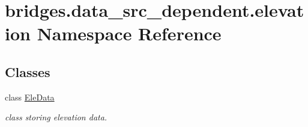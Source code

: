 \hypertarget{namespacebridges_1_1data__src__dependent_1_1elevation}{}\section{bridges.\+data\+\_\+src\+\_\+dependent.\+elevation Namespace Reference}
\label{namespacebridges_1_1data__src__dependent_1_1elevation}
\subsection*{Classes}
\begin{DoxyCompactItemize}
\item 
class \hyperlink{classbridges_1_1data__src__dependent_1_1elevation_1_1_ele_data}{Ele\+Data}
\begin{DoxyCompactList}\small\item\em class storing elevation data. \end{DoxyCompactList}\end{DoxyCompactItemize}
